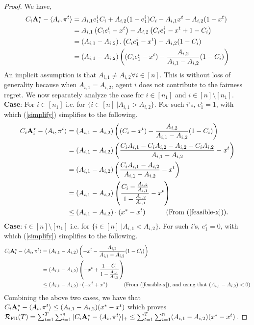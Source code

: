 \begin{proof}
We have, 
\begin{align}
    C_i\mathbf{A}^{\star}_i-\langle A_i, \pi^t\rangle &=A_{i,1}e^i_1C_i+A_{i,2}(1-e^i_1)C_i - A_{i,1}x^t - A_{i,2}(1-x^t) \nonumber \\
    &=A_{i,1}\left( C_ie^i_1-x^t \right)-A_{i,2}\left(C_ie^i_1-x^t+1-C_i\right) \nonumber \\
    &= \left(A_{i,1}-A_{i,2}\right).\left( C_ie^i_1-x^t \right)-A_{i,2}(1-C_i)\nonumber \\
    & = (A_{i,1}-A_{i,2})\left( (C_ie^i_1-x^t)-\frac{A_{i,2}}{A_{i,1}-A_{i,2}}(1-C_i)\right)\label{simplify}
\end{align}
An implicit assumption is that $A_{i, 1}\neq A_{i,2}\forall i\in [n]$. This is without loss of generality because when $A_{i, 1}= A_{i,2}$, agent $i$ does not contribute to the fairness regret.
We now separately analyze the case for $i\in[n_1]$ and $i\in[n]\setminus [n_1]$.
\newline
\textbf{Case}: For $i\in[n_1]$ i.e. for $\{i\in [n]\ | A_{i,1}>A_{i,2}\}$. For such $i$'s, $e^i_1=1$, with which (\ref{simplify}) simplifies to the following.
\begin{align}
C_i\Amax_i-\langle A_i, \pi^t\rangle & = (A_{i,1}-A_{i,2})\left( (C_i-x^t)-\frac{A_{i,2}}{A_{i,1}-A_{i,2}}(1-C_i)\right)\nonumber \\
&=(A_{i,1}-A_{i,2})\left( \frac{C_iA_{i,1}-C_iA_{i,2}-A_{i,2}+C_iA_{i,2}}{A_{i,1}-A_{i,2}}-x^t \right)\nonumber \\
&=(A_{i,1}-A_{i,2})\left( \frac{C_iA_{i,1}-A_{i,2}}{A_{i,1}-A_{i,2}}-x^t \right)\nonumber \\
&=(A_{i,1}-A_{i,2})\left( \frac{C_i-\frac{A_{i,2}}{A_{i,1}}}{1-\frac{A_{i,2}}{A_{i,1}}}-x^t \right)\nonumber \\
& \leq (A_{i,1}-A_{i,2})\cdot (x^*-x^t) \quad \tag{From (\ref{feasible-x})}. \label{FR-i1}
\end{align}
\newline
\textbf{Case}: $i\in[n]\setminus [n_1]$ i.e. for $\{i\in [n]\ | A_{i,1}<A_{i,2}\}$. For such $i$'s, $e^i_1=0$, with which (\ref{simplify}) simplifies to the following.
\begin{align}\label{FR-i2}
C_i\Amax_i-\langle A_i, \pi^t\rangle & = (A_{i,1}-A_{i,2})\left( -x^t-\frac{A_{i,2}}{A_{i,1}-A_{i,2}}(1-C_i)\right)\nonumber \\
& = (A_{i,1}-A_{i,2})\left( -x^t + \frac{1-C_i}{1-\frac{A_{i,1}}{A_{i,2}}} \right)\nonumber \\
&\leq (A_{i,1}-A_{i,2})\cdot (-x^t+x^*) \quad \tag{From (\ref{feasible-x}), and using that $(A_{i,1}-A_{i,2})<0$} 
\end{align}
Combining the above two cases, we have that $C_i\mathbf{A}^{\star}_i-\langle A_i, \pi^t\rangle\leq (A_{i,1}-A_{i,2})(x^*-x^t)$ which proves $\mathcal{R}_{\textsc{FR}}(T)=\sum_{t=1}^T\sum_{i=1}^n|C_i\mathbf{A}^{\star}_i-\langle A_i, \pi^t\rangle|_+\leq \sum_{t=1}^T\sum_{i=1}^n(A_{i,1}-A_{i,2})(x^*-x^t)$.    
\end{proof}

